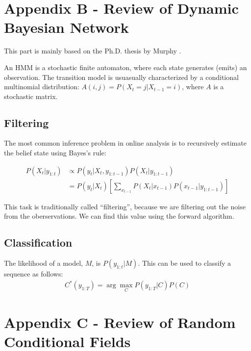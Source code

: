 \section{Appendix B - Review of Dynamic Bayesian Network}
This part is mainly based on the Ph.D. thesis by Murphy \cite{murphy02}.

An HMM is a stochastic finite automaton, where each state generates (emits) an
observation. The transition model is usuasually characterized by a conditional
multinomial distribution: $A(i, j) = P(X_t = j | X_{t-1} = i)$, where $A$ is a
stochastic matrix.

\subsection{Filtering}
The most common inference problem in online analysis is to recursively estimate
the belief state using Bayes's rule:

\begin{align*}
P(X_t | y_{1:t}) & \propto P(y_t | X_t, y_{1:t-1})P(X_t | y_{1:t-1}) \\
 				 & = P(y_t | X_t) \left[\sum_{x_{t - 1}} 
				 	 P(X_t | x_{t - 1})P(x_{t - 1} | y_{1:t - 1})\right]	
\end{align*}

This task is traditionally called ``filtering'', because we are filtering out
the noise from the oberservations. We can find this value using the forward
algorithm.

\subsection{Classification}
The likelihood of a model, $M$, is $P(y_{1:t}|M)$. This can be used to classify
a sequence as follows:
\begin{align*}
C^*(y_{1:T}) = \arg \max_{C} P(y_{1:T} | C)P(C)
\end{align*}

\section{Appendix C - Review of Random Conditional Fields}
